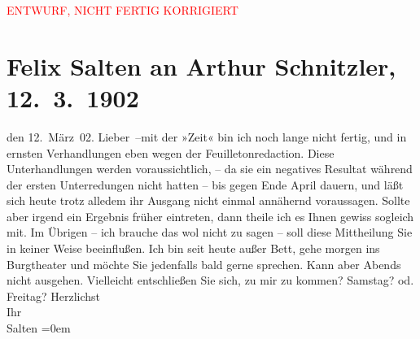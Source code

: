 
\begin{center}
            \textcolor{red}{ENTWURF, NICHT FERTIG KORRIGIERT}
                      \end{center}
            
         \renewcommand{\erwaehnteInstitutionen}{Institutionen: Die Zeit}
         \renewcommand{\erwaehnteOrte}{Orte: Burgtheater, Wien}
         \renewcommand{\erwaehnteWerke}{}
               \section[Felix Salten an Arthur Schnitzler, 12. 3. 1902]{ Felix Salten an Arthur Schnitzler, 12. 3. 1902}\nopagebreak{}\rehead{ }\begin{ledgroupsized}[t]{13cm}\normalsize\beginnumbering \toendnotes[C]{\smallbreak\pagebreak[2]} 
\toendnotes[C]{\smallbreak}\pstart
           \raggedleft{}{\pb}den
                     12. März 02. \pend
           \pstart
           Lieber –mit der »Zeit« bin
               ich noch lange nicht fertig, und in ernsten Verhandlungen eben wegen der
               Feuilletonredaction. Diese Unterhandlungen werden voraussichtlich, – da sie ein
               negatives Resultat während der ersten Unterredungen nicht hatten – bis gegen Ende
               April dauern, und läßt sich heute trotz alledem ihr Ausgang nicht einmal annähernd
               voraussagen. Sollte aber irgend ein Ergebnis früher eintreten, dann theile ich es
               Ihnen gewiss sogleich mit. Im Übrigen – ich brauche das wol nicht zu sagen – soll
               diese Mittheilung Sie in keiner Weise beeinflußen.\pend
           \pstart
           Ich bin seit heute außer Bett, gehe morgen ins Burgtheater und möchte Sie jedenfalls bald gerne sprechen. Kann aber Abends
               nicht ausgehen.\pend
           \pstart
           Vielleicht entschließen Sie sich, \label{K_L03326-1v}\label{K_L03326-1h} zu
               mir zu kommen? Samstag? od. Freitag? \pend
           \pstart
           Herzlichst {\\[\baselineskip]}Ihr {\\[\baselineskip]}\spacefill\mbox{Salten}\pend
           \leftskip=0em{}
         
         \endnumbering{}\end{ledgroupsized}\begin{anhang}\end{anhang}\newcommand{\dateiname}{L03326}\newcommand{\titel}{Felix Salten an Arthur Schnitzler, 12. 3. 1902}\newcommand{\editorInnen}{Martin Anton Müller und Laura Untner}
      